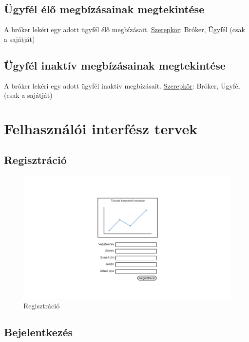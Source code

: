 \subsection{Ügyfél élő megbízásainak megtekintése}
A bróker lekéri egy adott ügyfél élő megbízásait.
\newline \underline{Szerepkör}: Bróker, Ügyfél (csak a sajátját)

\subsection{Ügyfél inaktív megbízásainak megtekintése}
A bróker lekéri egy adott ügyfél inaktív megbízásait.
\newline \underline{Szerepkör}: Bróker, Ügyfél (csak a sajátját)

\newpage
\section{Felhasználói interfész tervek}\label{sect:ui_design}


\subsection{Regisztráció}

\begin{figure}[!ht]
\centering
\includegraphics[width=150mm, keepaspectratio]{figures/user_1/register.png}
\caption{Regisztráció}
\label{fig:haromreteg}
\end{figure}

\subsection{Bejelentkezés}


